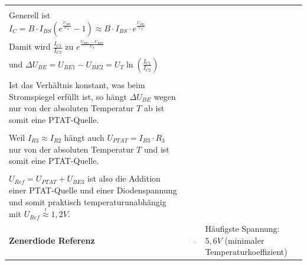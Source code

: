 \begin{longtable}{|l|l|l|}
\begin{minipage}{8cm}
			\textbf{Herleitung:} \\
			Generell ist $I_C = B \cdot I_{BS} \left(e^{\frac{U_{BE}}{U_T}} -1 \right)
							\approx B \cdot I_{BS} \cdot e^{\frac{U_{BE}}{U_T}}$ \\
			Damit wird $\frac{I_{C1}}{I_{C2}}$ zu $e^{\frac{U_{BE1}-U_{BE2}}{U_T}}$ \\
			und $\Delta U_{BE} = U_{BE1}-U_{BE2} = U_T \ln\left(\frac{I_{C1}}{I_{C2}}\right)$ \\
			\\
			Ist das Verhältnis \smash{$\frac{I_{C1}}{I_{C2}}$} konstant, was beim Stromspiegel
			erfüllt ist, so hängt $\Delta U_{BE}$ wegen \smash{$U_T=\frac{k \cdot T}{q}$} nur 
			von der absoluten Temperatur $T$ ab ist somit eine PTAT-Quelle. \\
			\\
			Weil $I_{R3} \approx I_{R2}$ hängt auch $U_{PTAT}=I_{R3} \cdot R_3$ nur von der
			absoluten Temperatur $T$ und ist somit eine PTAT-Quelle. \\
			\\
			$U_{Ref} = U_{PTAT} + U_{BE3}$ ist also die Addition einer PTAT-Quelle und einer
			Diodenspannung und somit praktisch temperaturunabhängig mit 
			$U_{Ref} \stackrel{!}{\approx} 1,2V$.
		\end{minipage}
	\\ \hline
		\begin{minipage}{4cm}
			\textbf{Zenerdiode Referenz}
		\end{minipage}
	&
		\begin{minipage}{6cm}
			\includegraphics[width=6cm,trim=0 0 0 -5]{images/zenerReferenz}
		\end{minipage}
	&
		\begin{minipage}{8cm}
			Häufigste Spannung: $5,6V$ (minimaler Temperaturkoeffizient)
		\end{minipage}
	\\ \hline
\end{longtable}

